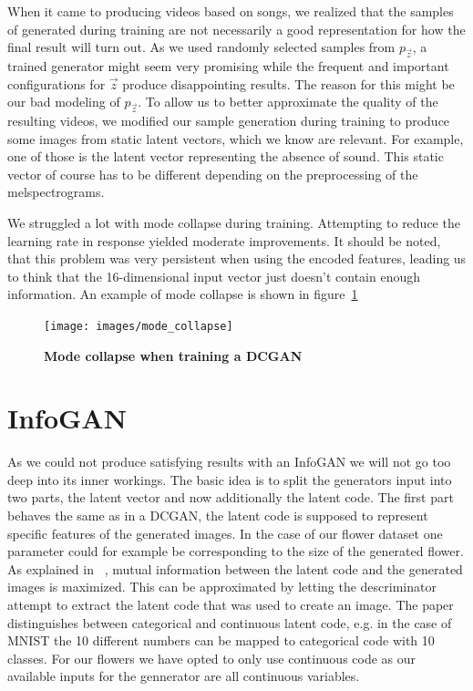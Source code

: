             When it came to producing videos based on songs, we realized that the samples of generated during training are not necessarily a good representation for how the final result will turn out. As we used randomly selected samples from $p_{\vec{z}}$, a trained generator might seem very promising while the frequent and important configurations for $\vec{z}$ produce disappointing results. The reason for this might be our bad modeling of $p_{\vec{z}}$. To allow us to better approximate the quality of the resulting videos, we modified our sample generation during training to produce some images from static latent vectors, which we know are relevant. For example, one of those is the latent vector representing the absence of sound. This static vector of course has to be different depending on the preprocessing of the melspectrograms.

            We struggled a lot with mode collapse during training. Attempting to reduce the learning rate in response yielded moderate improvements. It should be noted, that this problem was very persistent when using the encoded features, leading us to think that the 16-dimensional input vector just doesn't contain enough information. An example of mode collapse is shown in figure~\ref{fig:mode_collapse}

            \begin{figure}[ht]
                \centering
                \texttt{[image: images/mode\_collapse]}
                \caption[DCGAN mode collapse]
                {
                    \textbf{Mode collapse when training a DCGAN}
                }
                \label{fig:mode_collapse}
            \end{figure}

    \section{InfoGAN}
        
        As we could not produce satisfying results with an InfoGAN we will not go too deep into its inner workings. The basic idea is to split the generators input into two parts, the latent vector and now additionally the latent code. The first part behaves the same as in a DCGAN, the latent code is supposed to represent specific features of the generated images. In the case of our flower dataset one parameter could for example be corresponding to the size of the generated flower. As explained in ~\cite{infogan}, mutual information between the latent code and the generated images is maximized. This can be approximated by letting the descriminator attempt to extract the latent code that was used to create an image. The paper distinguishes between categorical and continuous latent code, e.g. in the case of MNIST the 10 different numbers can be mapped to categorical code with 10 classes. For our flowers we have opted to only use continuous code as our available inputs for the gennerator are all continuous variables.

